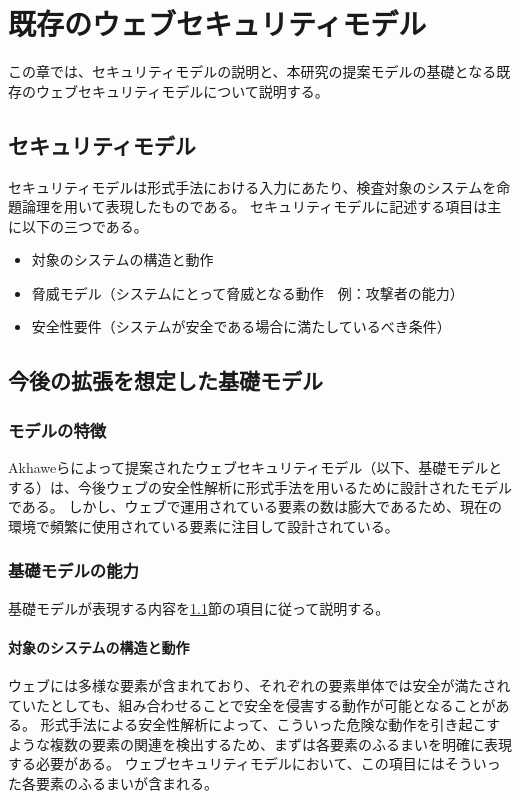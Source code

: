 \documentclass[12pt,a4paper]{jbook}
\begin{document}
\chapter{既存のウェブセキュリティモデル}
この章では、セキュリティモデルの説明と、本研究の提案モデルの基礎となる既存のウェブセキュリティモデルについて説明する。

\section{セキュリティモデル}
\label{sec:SecurityModel}
セキュリティモデルは形式手法における入力にあたり、検査対象のシステムを命題論理を用いて表現したものである。
セキュリティモデルに記述する項目は主に以下の三つである。
\begin{itemize}
\item 対象のシステムの構造と動作
\item 脅威モデル（システムにとって脅威となる動作　例：攻撃者の能力）
\item 安全性要件（システムが安全である場合に満たしているべき条件）
\end{itemize}

\section{今後の拡張を想定した基礎モデル}
\label{sec:based-model}

\subsection{モデルの特徴}
\label{sec:based-model-abstract}
Akhaweらによって提案されたウェブセキュリティモデル\cite{based-model}（以下、基礎モデルとする）は、今後ウェブの安全性解析に形式手法を用いるために設計されたモデルである。
しかし、ウェブで運用されている要素の数は膨大であるため、現在の環境で頻繁に使用されている要素に注目して設計されている。

\subsection{基礎モデルの能力}
基礎モデルが表現する内容を\ref{sec:SecurityModel}節の項目に従って説明する。

\subsubsection{対象のシステムの構造と動作}
ウェブには多様な要素が含まれており、それぞれの要素単体では安全が満たされていたとしても、組み合わせることで安全を侵害する動作が可能となることがある。
形式手法による安全性解析によって、こういった危険な動作を引き起こすような複数の要素の関連を検出するため、まずは各要素のふるまいを明確に表現する必要がある。
ウェブセキュリティモデルにおいて、この項目にはそういった各要素のふるまいが含まれる。
\end{document}
